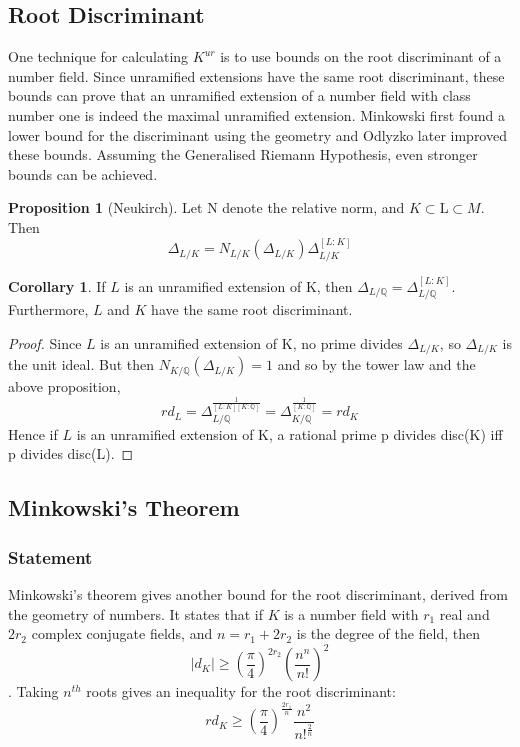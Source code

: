 \documentclass[12pt]{extarticle}
\newcommand{\<}{\langle}
\renewcommand{\>}{\rangle}
\theoremstyle{definition}
\newtheorem{corollary}{Corollary}
\newtheorem{proposition}{Proposition}
\begin{document}
\subsection{Root Discriminant}
One technique for calculating $K^{ur}$ is to use bounds on the root discriminant of a number field. Since unramified extensions have the same root discriminant, these bounds can prove that an unramified extension of a number field with class number one is indeed the maximal unramified extension. Minkowski first found a lower bound for the discriminant using the geometry and Odlyzko later improved these bounds. Assuming the Generalised Riemann Hypothesis, even stronger bounds can be achieved. 
\begin{proposition}[Neukirch]
Let N denote the relative norm, and $K\subset $L$ \subset M $. Then \begin{equation}
    \Delta_{L/K} = N_{L/K}(\Delta_{L/K})\Delta_{L/K}^{[L:K]}
\end{equation}
\end{proposition}
\begin{corollary}
 If $L$ is an unramified extension of K, then $\Delta_{L/\mathbb{Q}}= \Delta_{L/\mathbb{Q}}^{[L:K]}$. Furthermore, $L$ and $K$ have the same root discriminant.
\end{corollary}
\begin{proof}
Since $L$ is an unramified extension of K, no prime divides $\Delta_{L/K}$, so $\Delta_{L/K}$ is the unit ideal. But then $N_{K/\mathbb{Q}}(\Delta_{L/K})=1$ and so by the tower law and the above proposition, \begin{equation}
    rd_L=\Delta_{L/\mathbb{Q}}^\frac{1}{[L:K][K:\mathbb{Q}]}=\Delta_{K/\mathbb{Q}}^\frac{1}{[K:\mathbb{Q}]}= rd_K
\end{equation}
Hence if $L$ is an unramified extension of K, a rational prime p divides disc(K) iff p divides disc(L).
\end{proof}
\subsection{Minkowski's Theorem}
\subsubsection*{Statement}
Minkowski's theorem gives another bound for the root discriminant, derived from the geometry of numbers. It states that if $K$ is a number field with $r_1$ real and $2r_2$ complex conjugate fields, and $n=r_1+2r_2$ is the degree of the field, then 
\begin{equation}
|d_K| \geqslant \left( \frac{\pi}{4}\right)^{2r_2} \left( \frac{n^n}{n!}\right)^2
\end{equation}. Taking $n^{th}$ roots gives an inequality for the root discriminant:
\begin{equation}
rd_K\geqslant (\frac{\pi}{4})^{\frac{2r_1}{n}}\frac{n^2}{n!^{\frac{2}{n}}}
\end{equation} 
\end{document}
